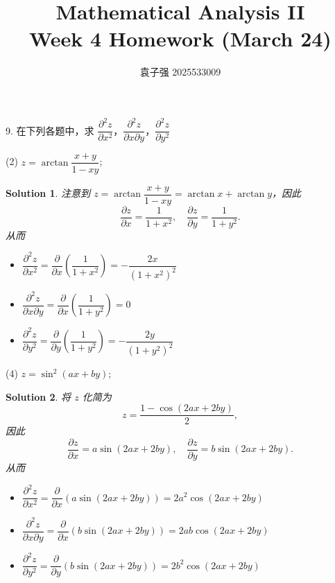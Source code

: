 \documentclass[a4paper,12pt]{article}
\title{Mathematical Analysis II\\Week 4 Homework (March 24)}
\author{袁子强\hspace{1cm} 2025533009}
\newtheorem*{sol}{Solution}
\begin{document}
\maketitle

9. 在下列各题中，求 $\dfrac{\partial^2 z}{\partial x^2}$，$\dfrac{\partial^2 z}{\partial x\partial y}$，$\dfrac{\partial^2 z}{\partial y^2}$

(2) $z = \arctan \dfrac{x+y}{1-xy}$;
\begin{sol}
    注意到 $z = \arctan\dfrac{x+y}{1-xy} = \arctan x + \arctan y$，因此
    $$
        \frac{\partial z}{\partial x} = \frac{1}{1+x^2}, \quad \frac{\partial z}{\partial y} = \frac{1}{1+y^2}.
    $$
    从而
    \begin{itemize}
        \item $\dfrac{\partial^2 z}{\partial x^2} = \dfrac{\partial}{\partial x}\left(\dfrac{1}{1+x^2}\right) = -\dfrac{2x}{(1+x^2)^2}$
        \item $\dfrac{\partial^2 z}{\partial x\partial y} = \dfrac{\partial}{\partial x}\left(\dfrac{1}{1+y^2}\right) = 0$
        \item $\dfrac{\partial^2 z}{\partial y^2} = \dfrac{\partial}{\partial y}\left(\dfrac{1}{1+y^2}\right) = -\dfrac{2y}{(1+y^2)^2}$
    \end{itemize}
\end{sol}

(4) $z = \sin^2(ax + by)$;
\begin{sol}
    将 $z$ 化简为
    $$
        z = \frac{1 - \cos(2ax + 2by)}{2},
    $$
    因此
    $$
        \frac{\partial z}{\partial x} = a\sin(2ax + 2by), \quad \frac{\partial z}{\partial y} = b\sin(2ax + 2by).
    $$
    从而
    \begin{itemize}
        \item $\dfrac{\partial^2 z}{\partial x^2} = \dfrac{\partial}{\partial x}\left(a\sin(2ax + 2by)\right) = 2a^2\cos(2ax + 2by)$
        \item $\dfrac{\partial^2 z}{\partial x\partial y} = \dfrac{\partial}{\partial x}\left(b\sin(2ax + 2by)\right) = 2ab\cos(2ax + 2by)$
        \item $\dfrac{\partial^2 z}{\partial y^2} = \dfrac{\partial}{\partial y}\left(b\sin(2ax + 2by)\right) = 2b^2\cos(2ax + 2by)$
    \end{itemize}
\end{sol}
\end{document}
